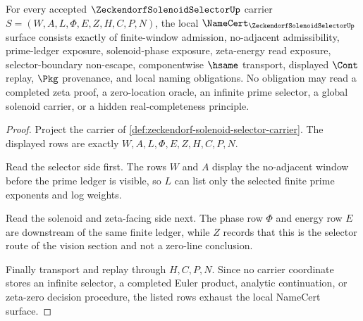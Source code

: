 \begin{theorem}
\label{thm:zeckendorf-solenoid-selector-namecert-obligations}
For every accepted $\ZeckendorfSolenoidSelectorUp$ carrier
$S=(W,A,L,\Phi,E,Z,H,C,P,N)$, the local
$\NameCert_{\ZeckendorfSolenoidSelectorUp}$ surface consists exactly of
finite-window admission, no-adjacent admissibility, prime-ledger exposure,
solenoid-phase exposure, zeta-energy read exposure, selector-boundary
non-escape, componentwise $\hsame$ transport, displayed $\Cont$ replay,
$\Pkg$ provenance, and local naming obligations. No obligation may read a
completed zeta proof, a zero-location oracle, an infinite prime selector, a
global solenoid carrier, or a hidden real-completeness principle.
\end{theorem}
\begin{proof}
Project the carrier of
\autoref{def:zeckendorf-solenoid-selector-carrier}. The displayed rows are
exactly $W,A,L,\Phi,E,Z,H,C,P,N$.

Read the selector side first. The rows $W$ and $A$ display the no-adjacent
window before the prime ledger is visible, so $L$ can list only the selected
finite prime exponents and log weights.

Read the solenoid and zeta-facing side next. The phase row $\Phi$ and energy
row $E$ are downstream of the same finite ledger, while $Z$ records that this
is the selector route of the vision section and not a zero-line conclusion.

Finally transport and replay through $H,C,P,N$. Since no carrier coordinate
stores an infinite selector, a completed Euler product, analytic continuation,
or zeta-zero decision procedure, the listed rows exhaust the local NameCert
surface.
\end{proof}

